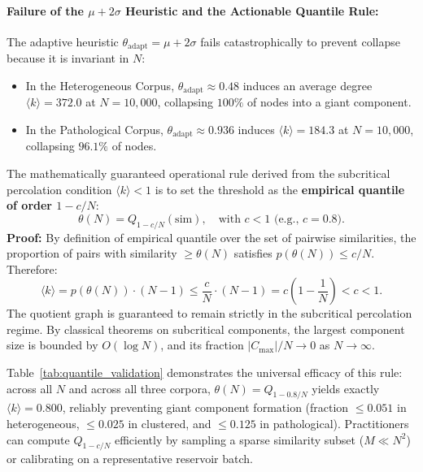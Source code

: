 \documentclass[11pt,a4paper]{article}
\theoremstyle{definition}
\begin{document}
\paragraph{Failure of the $\mu + 2\sigma$ Heuristic and the Actionable Quantile Rule:}
The adaptive heuristic $\theta_{\mathrm{adapt}} = \mu + 2\sigma$ fails catastrophically to prevent collapse because it is invariant in $N$:
\begin{itemize}
    \item In the Heterogeneous Corpus, $\theta_{\mathrm{adapt}} \approx 0.48$ induces an average degree $\langle k \rangle = 372.0$ at $N = 10{,}000$, collapsing $100\%$ of nodes into a giant component.
    \item In the Pathological Corpus, $\theta_{\mathrm{adapt}} \approx 0.936$ induces $\langle k \rangle = 184.3$ at $N = 10{,}000$, collapsing $96.1\%$ of nodes.
\end{itemize}

The mathematically guaranteed operational rule derived from the subcritical percolation condition $\langle k \rangle < 1$ is to set the threshold as the \textbf{empirical quantile of order $1 - c/N$}:
\begin{equation}
\theta(N) = Q_{1 - c/N}(\mathrm{sim}), \quad \text{with } c < 1 \text{ (e.g., } c = 0.8\text{)}.
\end{equation}
\textbf{Proof:} By definition of empirical quantile over the set of pairwise similarities, the proportion of pairs with similarity $\ge \theta(N)$ satisfies $p(\theta(N)) \le c/N$. Therefore:
\[
\langle k \rangle = p(\theta(N)) \cdot (N - 1) \le \frac{c}{N} \cdot (N - 1) = c \left(1 - \frac{1}{N}\right) < c < 1.
\]
The quotient graph is guaranteed to remain strictly in the subcritical percolation regime. By classical theorems on subcritical components, the largest component size is bounded by $O(\log N)$, and its fraction $|C_{\max}|/N \to 0$ as $N \to \infty$.

Table~\ref{tab:quantile_validation} demonstrates the universal efficacy of this rule: across all $N$ and across all three corpora, $\theta(N) = Q_{1 - 0.8/N}$ yields exactly $\langle k \rangle = 0.800$, reliably preventing giant component formation (fraction $\le 0.051$ in heterogeneous, $\le 0.025$ in clustered, and $\le 0.125$ in pathological). Practitioners can compute $Q_{1 - c/N}$ efficiently by sampling a sparse similarity subset ($M \ll N^2$) or calibrating on a representative reservoir batch.
\end{document}
